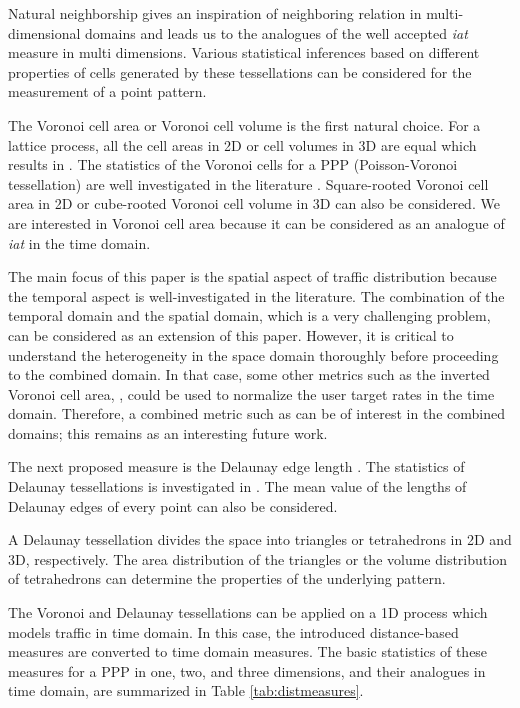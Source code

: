 \documentclass[journal]{IEEEtran}
\begin{document}
Natural neighborship gives an inspiration of neighboring relation in multi-dimensional domains and leads us to the analogues of the well accepted \textit{iat} measure in multi dimensions. Various statistical inferences based on different properties of cells generated by these tessellations can be considered for the measurement of a point pattern.

The Voronoi cell area or Voronoi cell volume  is the first natural choice. For a lattice process, all the cell areas in 2D or cell volumes in 3D are equal which results in . The statistics of the Voronoi cells for a PPP (Poisson-Voronoi tessellation) are well investigated in the literature \cite{barr2008applications,moller2007modern,gilbert1962random,borovkov2007simulation,tanemura2003statistical}. Square-rooted Voronoi cell area in 2D or cube-rooted Voronoi cell volume in 3D can also be considered. We are interested in Voronoi cell area  because it can be considered as an analogue of \textit{iat} in the time domain.

The main focus of this paper is the spatial aspect of traffic distribution because the temporal aspect is well-investigated in the literature. The combination of the temporal domain and the spatial domain, which is a very challenging problem, can be considered as an extension of this paper. However, it is critical to understand the heterogeneity in the space domain thoroughly before proceeding to the combined domain. In that case, some other metrics such as the inverted Voronoi cell area, , could be used to normalize the user target rates in the time domain. Therefore, a combined metric such as  can be of interest in the combined domains; this remains as an interesting future work.

The next proposed measure is the Delaunay edge length . The statistics of Delaunay tessellations is investigated in \cite{muche1996distributional,rathie1992volume,miles1972random}. The mean value of the lengths of Delaunay edges of every point can also be considered.

A Delaunay tessellation divides the space into triangles or tetrahedrons in 2D and 3D, respectively. The area distribution of the triangles or the volume distribution of tetrahedrons can determine the properties of the underlying pattern. 

The Voronoi and Delaunay tessellations can be applied on a 1D process which models traffic in time domain. In this case, the introduced distance-based measures are converted to time domain measures. The basic statistics of these measures for a PPP in one, two, and three dimensions, and their analogues in time domain, are summarized in Table \ref{tab:distmeasures}.
\end{document}
